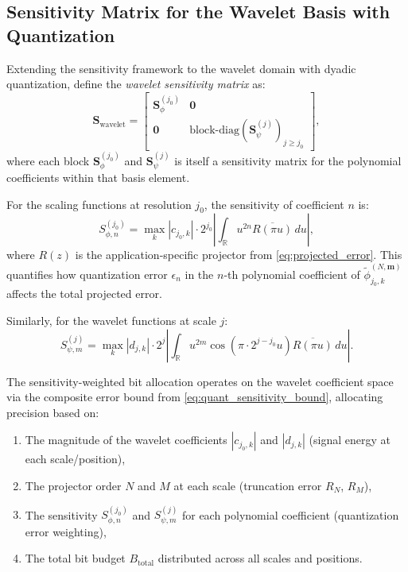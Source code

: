 \subsection{Sensitivity Matrix for the Wavelet Basis with Quantization}

Extending the sensitivity framework to the wavelet domain with dyadic quantization, define the \emph{wavelet sensitivity matrix} as:
\begin{equation}
\mathbf{S}_{\text{wavelet}} = \begin{bmatrix}
\mathbf{S}_{\phi}^{(j_0)} & \mathbf{0} \\
\mathbf{0} & \text{block-diag}(\mathbf{S}_{\psi}^{(j)})_{j \geq j_0}
\end{bmatrix},
\label{eq:wavelet_sens_matrix}
\end{equation}
where each block $\mathbf{S}_{\phi}^{(j_0)}$ and $\mathbf{S}_{\psi}^{(j)}$ is itself a sensitivity matrix for the polynomial coefficients within that basis element.

For the scaling functions at resolution $j_0$, the sensitivity of coefficient $n$ is:
\begin{equation}
S_{\phi,n}^{(j_0)} = \max_{k} \left|c_{j_0,k}\right| \cdot 2^{j_0} \left|\int_{\mathbb{R}} u^{2n} \overline{R(\pi u)} \, du\right|,
\label{eq:scaling_sens}
\end{equation}
where $R(z)$ is the application-specific projector from \eqref{eq:projected_error}. This quantifies how quantization error $\epsilon_n$ in the $n$-th polynomial coefficient of $\widetilde{\phi}_{j_0,k}^{(N,\mathbf{m})}$ affects the total projected error.

Similarly, for the wavelet functions at scale $j$:
\begin{equation}
S_{\psi,m}^{(j)} = \max_{k} \left|d_{j,k}\right| \cdot 2^{j} \left|\int_{\mathbb{R}} u^{2m} \cos(\pi \cdot 2^{j-j_0} u) \overline{R(\pi u)} \, du\right|.
\label{eq:wavelet_sens}
\end{equation}

The sensitivity-weighted bit allocation operates on the wavelet coefficient space via the composite error bound from \eqref{eq:quant_sensitivity_bound}, allocating precision based on:
\begin{enumerate}
\item The magnitude of the wavelet coefficients $|c_{j_0,k}|$ and $|d_{j,k}|$ (signal energy at each scale/position),
\item The projector order $N$ and $M$ at each scale (truncation error $R_N$, $R_M$),
\item The sensitivity $S_{\phi,n}^{(j_0)}$ and $S_{\psi,m}^{(j)}$ for each polynomial coefficient (quantization error weighting),
\item The total bit budget $B_{\text{total}}$ distributed across all scales and positions.
\end{enumerate}


